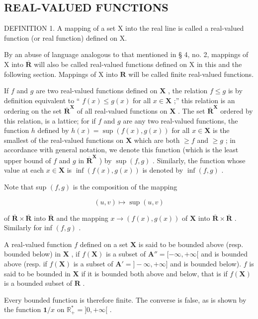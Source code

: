 \subsection{REAL-VALUED FUNCTIONS}

DEFINITION 1. A mapping of a set X into the real line is called a real-valued function (or real function) defined on X.

By an abuse of language analogous to that mentioned in § 4, no. 2, mappings of X into \(\overline{\mathbf{R}}\) will also be called real-valued functions defined on X in this and the following section. Mappings of X into \(\mathbf{R}\) will be called finite real-valued functions.

If \(f\) and \(g\) are two real-valued functions defined on \(\mathbf{X}\) , the relation \(f \leqslant g\) is by definition equivalent to `` \(f(x) \leqslant g(x)\) for all \(x \in \mathbf{X}\) ;'' this relation is an ordering on the set \(\overline{\mathbf{R}}^{\mathbf{X}}\) of all real-valued functions on \(\mathbf{X}\) . The set \(\overline{\mathbf{R}}^{\mathbf{X}}\) ordered by this relation, is a lattice; for if \(f\) and \(g\) are any two real-valued functions, the function \(h\) defined by \(h(x) = \sup (f(x), g(x))\) for all \(x \in \mathbf{X}\) is the smallest of the real-valued functions on \(\mathbf{X}\) which are both \(\geqslant f\) and \(\geqslant g\) ; in accordance with general notation, we denote this function (which is the least upper bound of \(f\) and \(g\) in \(\overline{\mathbf{R}}^{\mathbf{X}}\) ) by \(\sup (f, g)\) . Similarly, the function whose value at each \(x \in \mathbf{X}\) is \(\inf (f(x), g(x))\) is denoted by \(\inf (f, g)\) .

Note that sup \((f, g)\) is the composition of the mapping

\[
(u, v) \mapsto \sup (u, v)
\]

of \(\overline{\mathbf{R}}\times \overline{\mathbf{R}}\) into \(\overline{\mathbf{R}}\) and the mapping \(x\to (f(x),g(x))\) of \(\mathbf{X}\) into \(\overline{\mathbf{R}}\times \overline{\mathbf{R}}\) . Similarly for inf \((f,g)\) .

A real-valued function \(f\) defined on a set \(\mathbf{X}\) is said to be bounded above (resp. bounded below) in \(\mathbf{X}\) , if \(f(\mathbf{X})\) is a subset of \(\mathbf{A}'' = [-\infty, +\infty[\) and is bounded above (resp. if \(f(\mathbf{X})\) is a subset of \(\mathbf{A}' = ] - \infty, +\infty]\) and is bounded below). \(f\) is said to be bounded in \(\mathbf{X}\) if it is bounded both above and below, that is if \(f(\mathbf{X})\) is a bounded subset of \(\mathbf{R}\) .

Every bounded function is therefore finite. The converse is false, as is shown by the function \(\mathbf{1} / x\) on \(\mathbb{R}_+^* = ]0, +\infty[\) .
\relax{}
